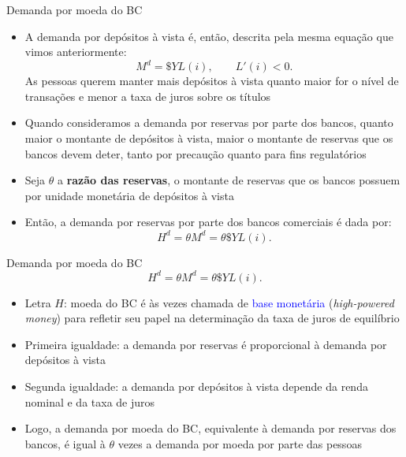 \documentclass[10pt]{beamer}
\begin{document}
\begin{frame}{Demanda por moeda do BC}
    \begin{itemize}
        \item A demanda por depósitos à vista é, então, descrita pela mesma equação que vimos anteriormente:
        \begin{equation}
            M^d = \$Y L(i), \qquad L'(i)<0.
        \end{equation}
        As pessoas querem manter mais depósitos à vista quanto maior for o nível de transações e menor a taxa de juros sobre os títulos
        \bigskip
        \item Quando consideramos a demanda por reservas por parte dos bancos, quanto maior o montante de depósitos à vista, maior o montante de reservas que os bancos devem deter, tanto por precaução quanto para fins regulatórios
        \bigskip
        \item Seja $\theta$ a \textbf{razão das reservas}, o montante de reservas que os bancos possuem por unidade monetária de depósitos à vista
        \bigskip
        \item Então, a demanda por reservas por parte dos bancos comerciais é dada por:
        \begin{equation}
            H^d = \theta M^d = \theta \$Y L(i).
            \label{eq4}
        \end{equation}
    \end{itemize}
\end{frame}

\begin{frame}{Demanda por moeda do BC}
    \begin{equation*}
        H^d = \theta M^d = \theta \$Y L(i).        
    \end{equation*}
    \bigskip
    \begin{itemize}
        \item Letra $H$: moeda do BC é às vezes chamada de \textcolor{blue}{base monetária} (\emph{high-powered money}) para refletir seu papel na determinação da taxa de juros de equilíbrio
        \bigskip
        \item Primeira igualdade: a demanda por reservas é proporcional à demanda por depósitos à vista
        \bigskip
        \item Segunda igualdade: a demanda por depósitos à vista depende da renda nominal e da taxa de juros
        \bigskip
        \item Logo, a demanda por moeda do BC, equivalente à demanda por reservas dos bancos, é igual à $\theta$ vezes a demanda por moeda por parte das pessoas
    \end{itemize}
\end{frame}
\end{document}
